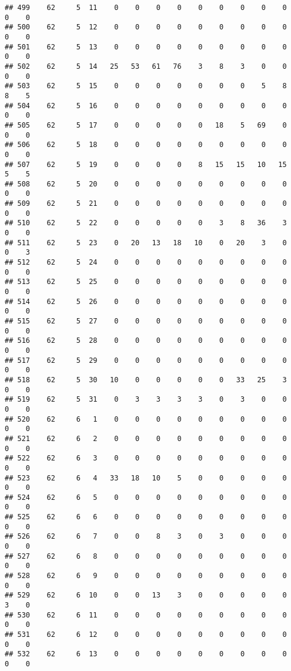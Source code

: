 \documentclass[]{article}
\begin{document}
\begin{verbatim}
## 499    62     5  11    0    0    0    0    0    0    0    0    0    0    0
## 500    62     5  12    0    0    0    0    0    0    0    0    0    0    0
## 501    62     5  13    0    0    0    0    0    0    0    0    0    0    0
## 502    62     5  14   25   53   61   76    3    8    3    0    0    0    0
## 503    62     5  15    0    0    0    0    0    0    0    5    8    8    5
## 504    62     5  16    0    0    0    0    0    0    0    0    0    0    0
## 505    62     5  17    0    0    0    0    0   18    5   69    0    0    0
## 506    62     5  18    0    0    0    0    0    0    0    0    0    0    0
## 507    62     5  19    0    0    0    0    8   15   15   10   15    5    5
## 508    62     5  20    0    0    0    0    0    0    0    0    0    0    0
## 509    62     5  21    0    0    0    0    0    0    0    0    0    0    0
## 510    62     5  22    0    0    0    0    0    3    8   36    3    0    0
## 511    62     5  23    0   20   13   18   10    0   20    3    0    0    3
## 512    62     5  24    0    0    0    0    0    0    0    0    0    0    0
## 513    62     5  25    0    0    0    0    0    0    0    0    0    0    0
## 514    62     5  26    0    0    0    0    0    0    0    0    0    0    0
## 515    62     5  27    0    0    0    0    0    0    0    0    0    0    0
## 516    62     5  28    0    0    0    0    0    0    0    0    0    0    0
## 517    62     5  29    0    0    0    0    0    0    0    0    0    0    0
## 518    62     5  30   10    0    0    0    0    0   33   25    3    0    0
## 519    62     5  31    0    3    3    3    3    0    3    0    0    0    0
## 520    62     6   1    0    0    0    0    0    0    0    0    0    0    0
## 521    62     6   2    0    0    0    0    0    0    0    0    0    0    0
## 522    62     6   3    0    0    0    0    0    0    0    0    0    0    0
## 523    62     6   4   33   18   10    5    0    0    0    0    0    0    0
## 524    62     6   5    0    0    0    0    0    0    0    0    0    0    0
## 525    62     6   6    0    0    0    0    0    0    0    0    0    0    0
## 526    62     6   7    0    0    8    3    0    3    0    0    0    0    0
## 527    62     6   8    0    0    0    0    0    0    0    0    0    0    0
## 528    62     6   9    0    0    0    0    0    0    0    0    0    0    0
## 529    62     6  10    0    0   13    3    0    0    0    0    0    3    0
## 530    62     6  11    0    0    0    0    0    0    0    0    0    0    0
## 531    62     6  12    0    0    0    0    0    0    0    0    0    0    0
## 532    62     6  13    0    0    0    0    0    0    0    0    0    0    0

\end{verbatim}
\end{document}
